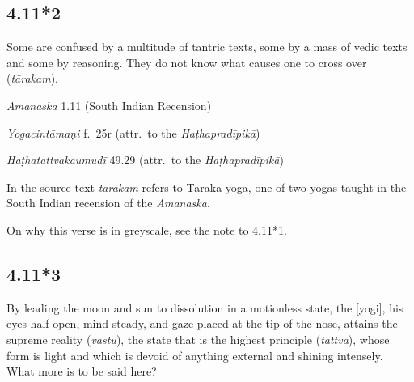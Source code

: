 \begin{ekdosis}
\subsection*{4.11*2}
\begin{translation}[hp04_011_2]
Some are confused by a multitude of tantric texts, some by a mass of vedic texts and some by reasoning. They do not know what causes one to cross over (\emph{tārakam}).%
\end{translation}


\begin{sources}[hp04_011_2]
\emph{Amanaska} 1.11 (South Indian Recension)
\begin{versinnote}
\end{versinnote}
\end{sources}

\begin{testimonia}[hp04_011_2]
\emph{Yogacintāmaṇi} f.~25r (attr.~to the \emph{Haṭhapradīpikā})
\begin{versinnote}
\end{versinnote}

\emph{Haṭhatattvakaumudī} 49.29 (attr.~to the \emph{Haṭhapradīpikā})
\begin{versinnote}
\end{versinnote}
\end{testimonia}

\begin{philcomm}[hp04_011_2]
In the source text \emph{tārakam} refers to Tāraka yoga, one of two yogas taught in the South Indian recension of the \emph{Amanaska}.\lb

On why this verse is in greyscale, see the note to 4.11*1.    
\end{philcomm}

\subsection*{4.11*3}
\begin{translation}[hp04_011_3]
By leading the moon and sun to dissolution in a motionless state, the [yogi], his eyes half open, mind steady, and gaze placed at the tip of the nose, attains the supreme reality (\textit{vastu}), the state that is the highest principle (\textit{tattva}), 
whose form is light and which is devoid of anything external and shining intensely. What more is to be said here?
\end{translation}


\end{ekdosis}
